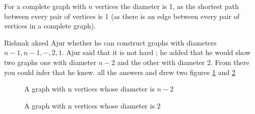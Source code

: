For a complete graph with $n$ vertices the diameter is 1, as the shortest path between every pair of vertices is 1 (as there is an edge between every pair of vertices in a complete graph). 

Rishnak aksed Ajur whether he can construct graphs with diameters $n-1, n-1, \cdots, 2, 1$. Ajur said that it is not hard ; he added that he would show two graphs one with diameter $n-2$ and the other with diameter 2. From there you could infer that he knew. all the answers and drew two figures \ref{12g5} and \ref{12g6}
\begin{figure}
\begin{center}
\caption{ A graph with n vertices whose diameter is $n-2$ }\label{12g5}
\end{center}
\end{figure}
\begin{figure}
 \begin{center}
\caption{ A graph with n vertices whose diameter is $2$ }\label{12g6}
\end{center}
\end{figure}

